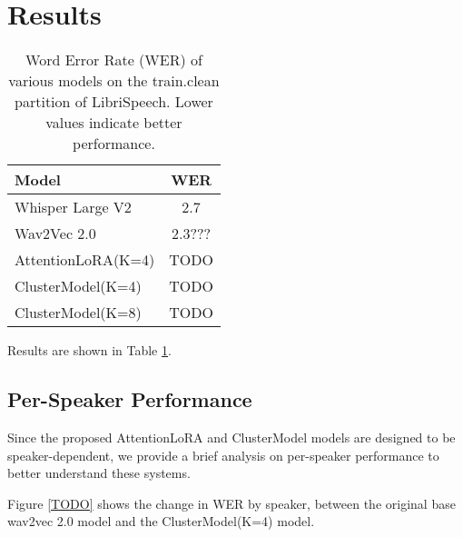 \section{Results}

\begin{table}[htbp]
  \centering
  \begin{tabular}{lc}
    \toprule
    \textbf{Model} &WER \\
    \midrule
    Whisper Large V2 \cite{whisperv2} &2.7 \\
    Wav2Vec 2.0 \cite{wav2vec2} &2.3??? \\
    \midrule
    AttentionLoRA(K=4) &TODO \\
    ClusterModel(K=4) &TODO \\
    ClusterModel(K=8) &TODO \\
    \bottomrule
  \end{tabular}
  \caption{Word Error Rate (WER) of various models on the train.clean partition of LibriSpeech. Lower values indicate better performance.}
  \label{tab:video_descriptor_comparison}
\end{table}

Results are shown in Table \ref{tab:video_descriptor_comparison}.

\subsection{Per-Speaker Performance}

Since the proposed AttentionLoRA and ClusterModel models are designed to be speaker-dependent,
we provide a brief analysis on per-speaker performance to better understand these systems.

Figure \ref{TODO} shows the change in WER by speaker, between the original base wav2vec 2.0 model and the ClusterModel(K=4) model.
